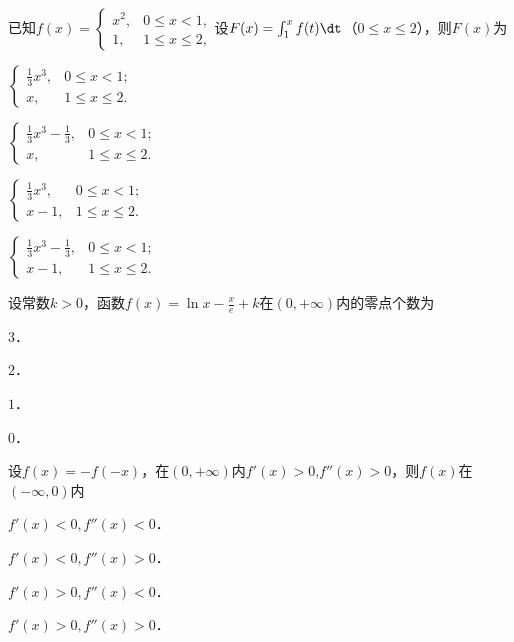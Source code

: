 \documentclass[plain,noanswer,medmath]{../../template/jnuexam}
\begin{document}
\begin{problem}
已知$f(x) = \begin{cases}
  x^2, & 0 \le x < 1, \\
    1, & 1 \le x \le 2,
\end{cases}$设$F(x) = \int_1^xf (t)\dt$（$0 \le x \le 2$），则$F(x)$为\pickout{}
\begin{abcd}
\item $\begin{cases}
  \frac{1}{3}x^3, & 0 \le x < 1; \\
               x, & 1 \le x \le 2.
\end{cases}$
\item $\begin{cases}
  \frac{1}{3}x^3 - \frac{1}{3}, & 0 \le x < 1; \\
                             x, & 1 \le x \le 2.
\end{cases}$
\item $\begin{cases}
  \frac{1}{3}x^3, & 0 \le x < 1; \\
           x - 1, & 1 \le x \le 2.
\end{cases}$
\item $\begin{cases}
  \frac{1}{3}x^3 - \frac{1}{3}, & 0 \le x < 1; \\
                         x - 1, & 1 \le x \le 2.
\end{cases}$
\end{abcd}
\end{problem}


\begin{problem}
设常数$k > 0$，函数$f(x) = \ln x - \frac{x}{e} + k$在$(0, +\infty)$内的零点个数为\pickout{}
\begin{abcd}
\item $3$．			
\item $2$．			
\item $1$．			
\item $0$．
\end{abcd}
\end{problem}


\begin{problem}
设$f(x) = - f(- x)$，在$(0, +\infty)$内$f'(x) > 0$,$f''(x) > 0$，则$f(x)$在$(-\infty ,0)$内\pickout{}
\begin{abcd}
\item $f'(x) < 0,f''(x) < 0$．		
\item $f'(x) < 0,f''(x) > 0$．
\item $f'(x) > 0,f''(x) < 0$．		
\item $f'(x) > 0,f''(x) > 0$．
\end{abcd}
\end{problem}
\end{document}
